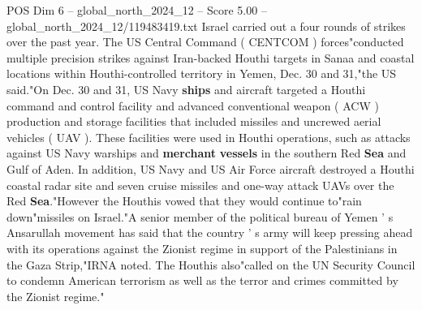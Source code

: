 \begin{textsample}{POS Dim 6 – global\_north\_2024\_12 – Score 5.00 – global\_north\_2024\_12/119483419.txt}
Israel carried out a four rounds of strikes over the past year.
The US Central Command ( CENTCOM ) forces"conducted multiple precision strikes against Iran-backed Houthi targets in Sanaa and coastal locations within Houthi-controlled territory in Yemen, Dec. 30 and 31,"the US said."On Dec. 30 and 31, US Navy \textbf{ships} and aircraft targeted a Houthi command and control facility and advanced conventional weapon ( ACW ) production and storage facilities that included missiles and uncrewed aerial vehicles ( UAV ).
These facilities were used in Houthi operations, such as attacks against US Navy warships and \textbf{merchant} \textbf{vessels} in the southern Red \textbf{Sea} and Gulf of Aden.
In addition, US Navy and US Air Force aircraft destroyed a Houthi coastal radar site and seven cruise missiles and one-way attack UAVs over the Red \textbf{Sea}."However the Houthis vowed that they would continue to"rain down"missiles on Israel."A senior member of the political bureau of Yemen ' s Ansarullah movement has said that the country ' s army will keep pressing ahead with its operations against the Zionist regime in support of the Palestinians in the Gaza Strip,"IRNA noted.
The Houthis also"called on the UN Security Council to condemn American terrorism as well as the terror and crimes committed by the Zionist regime."

\end{textsample}
